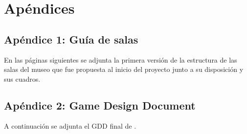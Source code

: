 \chapter{Apéndices}
\label{chap:apendices}

\section{Apéndice 1: Guía de salas}
\label{anexo:guia-salas}

En las páginas siguientes se adjunta la primera versión de la estructura de las salas del museo que fue propuesta al inicio del proyecto junto a su disposición y sus cuadros.



\section{Apéndice 2: Game Design Document}
\label{anexo:gdd}

A continuación se adjunta el \acs{GDD} final de \MineRVa.

\newpage




